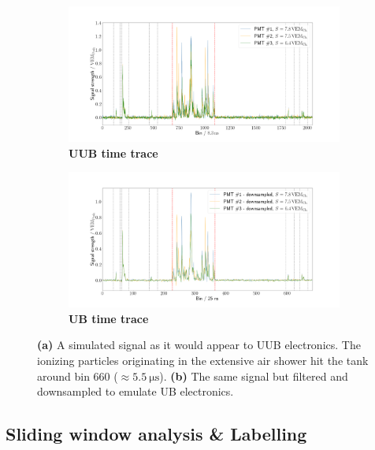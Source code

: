 \begin{figure}
	\begin{subfigure}[b]{0.5\textwidth}
		\centering
		\includegraphics[width=\textwidth]{./plots/time_trace_UUB.png}
		\caption{\textbf{UUB time trace}}
		\label{fig:uub-time-trace}
	\end{subfigure}
	\hfill
	\begin{subfigure}[b]{0.5\textwidth}
		\centering
		\includegraphics[width=\textwidth]{./plots/time_trace_UB.png}
		\caption{\textbf{UB time trace}}
		\label{fig:ub-time-trace}
	\end{subfigure}
	\caption{\textbf{(a)} A simulated signal as it would appear to UUB electronics. The ionizing particles originating in the extensive air shower hit the tank 
	around bin 660 ($\approx\SI{5.5}{\micro\second}$). \textbf{(b)} The same signal but filtered and downsampled to emulate UB electronics.}
	\label{fig:uub-ub-comparison}
\end{figure}

\subsection{Sliding window analysis \& Labelling}
\label{ssec:sliding-window-analysis}


